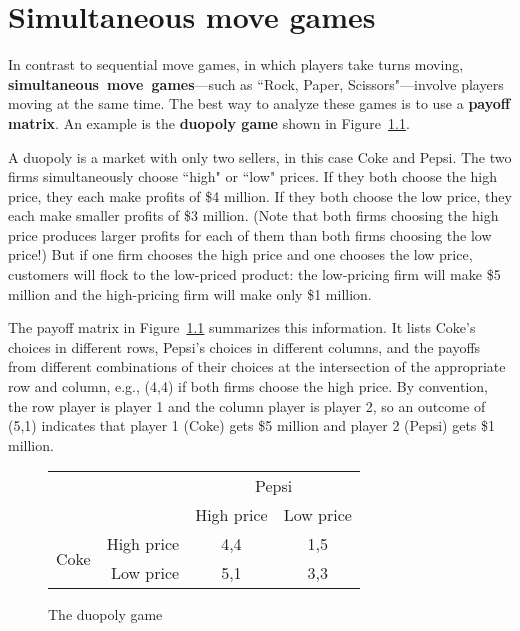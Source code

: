 \chapter{Simultaneous move games}
\label{2simultaneous}

In contrast to sequential move games, in which players take turns moving, \mbox{\textbf{simultaneous move games}}---such as ``Rock, Paper, Scissors"---involve players moving at the same time. The best way to analyze these games is to use a \textbf{payoff matrix}. An example is the \textbf{duopoly game} shown in Figure~\ref{game_coke}.

A duopoly is a market with only two sellers, in this case Coke and Pepsi. The two firms simultaneously choose ``high" or ``low" prices. If they both choose the high price, they each make profits of \$4 million. If they both choose the low price, they each make smaller profits of \$3 million. (Note that both firms choosing the high price produces larger profits for each of them than both firms choosing the low price!) But if one firm chooses the high price and one chooses the low price, customers will flock to the low-priced product: the low-pricing firm will make \$5 million and the high-pricing firm will make only \$1 million.

The payoff matrix in Figure~\ref{game_coke} summarizes this information. It lists Coke's choices in different rows, Pepsi's choices in different columns, and the payoffs from different combinations of their choices at the intersection of the appropriate row and column, e.g., (4,4) if both firms choose the high price. By convention, the row player is player 1 and the column player is player 2, so an outcome of (5,1) indicates that player 1 (Coke) gets \$5 million and player 2 (Pepsi) gets \$1 million.


\begin{figure}[h]
\begin{center}
\begin{tabular}{crcc}
& & \multicolumn{2}{c}{Pepsi} \\ [.15cm]
& & High price & Low price \\ \cline{3-4}
\multirow{2}{1.5cm}{Coke} & High price & \multicolumn{1}{|c|}{4,4} & \multicolumn{1}{c|}{1,5} \\ \cline{3-4}
                   & Low price & \multicolumn{1}{|c|}{5,1} & \multicolumn{1}{c|}{3,3} \\ \cline{3-4}
\end{tabular}
\end{center}
\caption{The duopoly game}
\label{game_coke} %
\end{figure}





